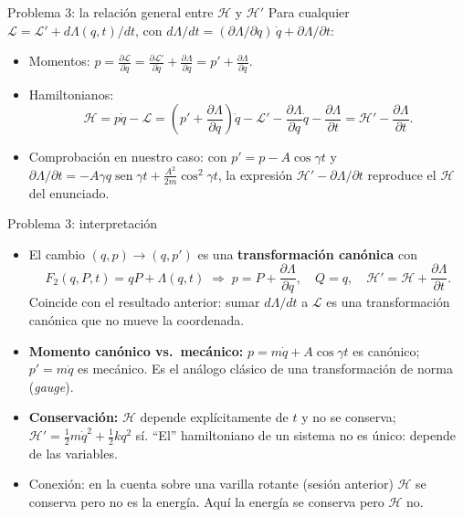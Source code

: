 \documentclass[spanish]{beamer}
\providecommand{\sen}{\operatorname{sen}}
\newcommand{\Lag}{\mathcal{L}}
\newcommand{\Ham}{\mathcal{H}}
\newcommand{\pd}[2]{\frac{\partial #1}{\partial #2}}
\begin{document}
\begin{frame}{Problema 3: la relación general entre $\Ham$ y $\Ham'$}
Para cualquier $\Lag = \Lag' + d\Lambda(q,t)/dt$, con
$d\Lambda/dt = (\partial\Lambda/\partial q)\,\dot q + \partial\Lambda/\partial t$:
\begin{itemize}
  \item<2-> Momentos:
  \(
    p = \pd{\Lag}{\dot q} = \pd{\Lag'}{\dot q} + \pd{\Lambda}{q} = p' + \pd{\Lambda}{q}.
  \)
  \item<3-> Hamiltonianos:
  \[
    \Ham = p\dot q - \Lag
         = \left(p' + \pd{\Lambda}{q}\right)\dot q - \Lag'
           - \pd{\Lambda}{q}\dot q - \pd{\Lambda}{t}
         = \Ham' - \pd{\Lambda}{t} .
  \]
  \item<4-> Comprobación en nuestro caso: con $p' = p - A\cos\gamma t$ y
  $\partial\Lambda/\partial t = -A\gamma q\sen\gamma t + \frac{A^2}{2m}\cos^2\gamma t$,
  la expresión $\Ham' - \partial\Lambda/\partial t$ reproduce el $\Ham$ del enunciado.
\end{itemize}
\end{frame}

\begin{frame}{Problema 3: interpretación}
\begin{itemize}
  \item<1-> El cambio $(q,p)\to(q,p')$ es una \textbf{transformación canónica} con
  \[
    F_2(q,P,t) = qP + \Lambda(q,t)
    \;\Rightarrow\;
    p = P + \pd{\Lambda}{q},\quad Q = q,\quad
    \Ham' = \Ham + \pd{\Lambda}{t} .
  \]
  Coincide con el resultado anterior: sumar $d\Lambda/dt$ a $\Lag$ es una
  transformación canónica que no mueve la coordenada.
  \item<2-> \textbf{Momento canónico vs.\ mecánico:} $p = m\dot q + A\cos\gamma t$ es
        canónico; $p' = m\dot q$ es mecánico. Es el análogo clásico de una
        transformación de norma (\emph{gauge}).
  \item<3-> \textbf{Conservación:} $\Ham$ depende explícitamente de $t$ y no se
        conserva; $\Ham' = \frac12 m\dot q^2 + \frac12 kq^2$ sí. ``El''
        hamiltoniano de un sistema no es único: depende de las variables.
  \item<4-> Conexión: en la cuenta sobre una varilla rotante (sesión anterior)
        $\Ham$ se conserva pero no es la energía. Aquí la energía se conserva
        pero $\Ham$ no.
\end{itemize}
\end{frame}

\end{document}
